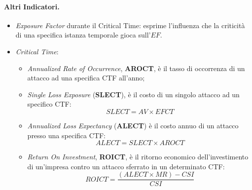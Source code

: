 \paragraph{Altri Indicatori.}

\begin{itemize}
    \item \textit{Exposure Factor} durante il Critical Time:
          esprime l'influenza che la criticità di una specifica
          istanza temporale gioca sull'\(EF\).
    \item \textit{Critical Time}:
          \begin{itemize}
              \item \textit{Annualized Rate of Occurrence}, \textbf{AROCT},
                    è il tasso di occorrenza di un attacco ad
                    una specifica CTF all'anno;
              \item \textit{Single Loss Exposure} (\textbf{SLECT}), è il costo
                    di un singolo attacco ad un specifico CTF:
                    \[
                        SLECT = AV \times EFCT
                    \]
              \item \textit{Annualized Loss Expectancy} (\textbf{ALECT}) è il
                    costo annuo di un attacco presso una
                    specifica CTF:
                    \[
                        ALECT = SLECT \times AROCT
                    \]
              \item \textit{Return On Investment}, \textbf{ROICT}, è il ritorno
                    economico dell'investimento di
                    un'impresa contro un attacco sferrato in un determinato CTF:
                    \[
                        ROICT = \frac{(ALECT \times MR) - CSI}{CSI}
                    \]
          \end{itemize}
\end{itemize}